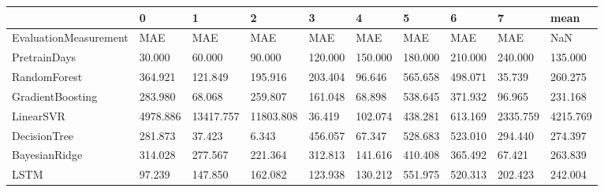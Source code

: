 \begin{tabular}{llllllllll}
\toprule
{} &        0 &         1 &         2 &       3 &       4 &       5 &       6 &        7 &     mean \\
\midrule
EvaluationMeasurement &      MAE &       MAE &       MAE &     MAE &     MAE &     MAE &     MAE &      MAE &      NaN \\
PretrainDays          &   30.000 &    60.000 &    90.000 & 120.000 & 150.000 & 180.000 & 210.000 &  240.000 &  135.000 \\
RandomForest          &  364.921 &   121.849 &   195.916 & 203.404 &  96.646 & 565.658 & 498.071 &   35.739 &  260.275 \\
GradientBoosting      &  283.980 &    68.068 &   259.807 & 161.048 &  68.898 & 538.645 & 371.932 &   96.965 &  231.168 \\
LinearSVR             & 4978.886 & 13417.757 & 11803.808 &  36.419 & 102.074 & 438.281 & 613.169 & 2335.759 & 4215.769 \\
DecisionTree          &  281.873 &    37.423 &     6.343 & 456.057 &  67.347 & 528.683 & 523.010 &  294.440 &  274.397 \\
BayesianRidge         &  314.028 &   277.567 &   221.364 & 312.813 & 141.616 & 410.408 & 365.492 &   67.421 &  263.839 \\
LSTM                  &   97.239 &   147.850 &   162.082 & 123.938 & 130.212 & 551.975 & 520.313 &  202.423 &  242.004 \\
\bottomrule
\end{tabular}
